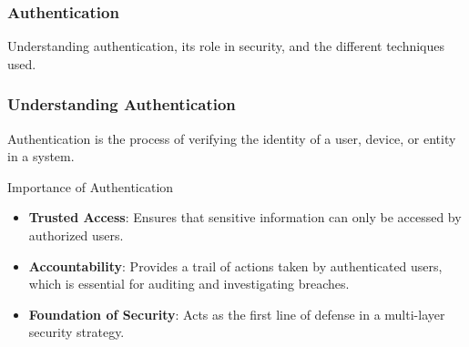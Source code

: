 \documentclass{beamer}
\begin{document}
\begin{frame}[fragile]
    \frametitle{Authentication}
    Understanding authentication, its role in security, and the different techniques used.
\end{frame}

\begin{frame}[fragile]
    \frametitle{Understanding Authentication}
    Authentication is the process of verifying the identity of a user, device, or entity in a system. 

    \begin{block}{Importance of Authentication}
        \begin{itemize}
            \item \textbf{Trusted Access}: Ensures that sensitive information can only be accessed by authorized users.
            \item \textbf{Accountability}: Provides a trail of actions taken by authenticated users, which is essential for auditing and investigating breaches.
            \item \textbf{Foundation of Security}: Acts as the first line of defense in a multi-layer security strategy.
        \end{itemize}
    \end{block}
\end{frame}
\end{document}
